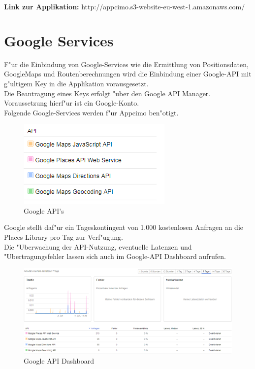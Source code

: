\documentclass[a4paper, 11pt]{scrreprt}
\begin{document}
\textbf{Link zur Applikation: } http://appcimo.s3-website-eu-west-1.amazonaws.com/


\section{Google Services}

F"ur die Einbindung von Google-Services wie die Ermittlung von Positionsdaten, GoogleMaps und Routenberechnungen wird die Einbindung einer Google-API mit g"ultigem Key in die Applikation vorausgesetzt. \\

Die Beantragung eines Keys erfolgt "uber den Google API Manager. Voraussetzung hierf"ur ist ein Google-Konto.\\

Folgende Google-Services werden f"ur Appcimo ben"otigt.

\begin{figure} [H]
\begin{center}
\includegraphics[scale=1]{google1.png}
\caption{Google API's}
\label{googleapi}
\end{center}
\end{figure}

Google stellt daf"ur ein Tageskontingent von 1.000 kostenlosen Anfragen an die Places Library pro Tag zur Verf"ugung.\\
Die "Uberwachung der API-Nutzung, eventuelle Latenzen und "Ubertragungsfehler lassen sich auch im Google-API Dashboard aufrufen.

\begin{figure} [H]
\begin{center}
\includegraphics[scale=1]{google2.png}
\caption{Google API Dashboard}
\label{googledashboard}
\end{center}
\end{figure}
\end{document}
